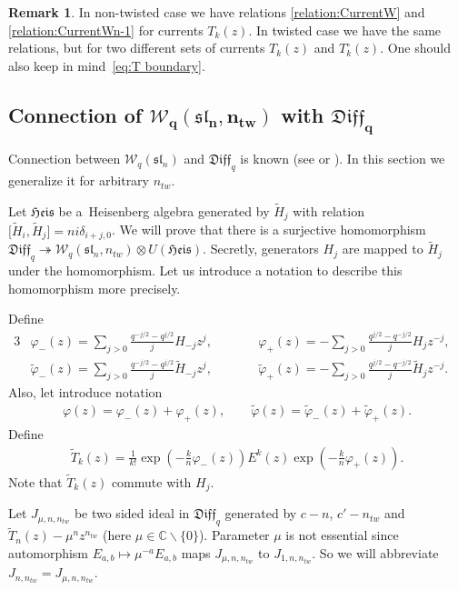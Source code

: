\documentclass[pdftex]{sigma}
\numberwithin{equation}{section}
\theoremstyle{definition}
\newtheorem{Remark}[Theorem]{Remark}
\newcommand{\qD}{\mathfrak{Diff}_q}
\newcommand{\T}{\tilde{T}}
\newcommand{ \W }{ \mathcal{W}_{q} ( \mathfrak{sl}_n ) }
\newcommand{ \twW }{ \mathcal{W}_{q} ( \mathfrak{sl}_n, n_{tw} ) }
\newcommand{\tphi}{\tilde{\varphi}}
\newcommand{\UH}{\otimes U(\mathfrak{Heis})}
\newcommand{\WH}{\twW \UH}
\newcommand{\ha}{\tilde{H}}
\begin{document}
\begin{Remark}In non-twisted case we have relations \eqref{relation:CurrentW} and \eqref{relation:CurrentWn-1} for currents $T_k(z)$. In twisted case we have the same relations, but for two different sets of currents $T_k(z)$ and $T_k^\circ(z)$. One should also keep in mind~\eqref{eq:T boundary}.
\end{Remark}

\subsection[Connection of $\twW$ with $\qD$]{Connection of $\boldsymbol{\twW}$ with $\boldsymbol{\qD}$}

Connection between $\W$ and $\qD$ is known (see \cite[Proposition~2.14]{FHSSY} or \cite[Proposition~2.25]{N16}). In this section we generalize it for arbitrary $n_{tw}$.

Let $\mathfrak{Heis}$ be a~Heisenberg algebra generated by $\ha_j$ with relation $\big[\ha_i, \ha_j\big]=ni\delta_{i+j, 0}$. We will prove that there is a surjective homomorphism $\qD \twoheadrightarrow \WH$. Secretly, generators $H_j$ are mapped to $\ha_j$ under the homomorphism. Let us introduce a notation to describe this homomorphism more precisely.

Define
\begin{alignat}{3}
& \varphi_{-} (z) = \sum_{j>0} \frac{q^{-j/2}-q^{j/2}}{j} H_{-j} z^j,\qquad & &
\varphi_{+} (z) = - \sum_{j>0} \frac{q^{j/2}-q^{-j/2}}{j} H_{j} z^{-j}, &\label{def:varphi} \\
& \tphi_{-} (z)= \sum_{j>0} \frac{q^{-j/2}-q^{j/2}}{j} \ha_{-j} z^j, \qquad &&
\tphi_{+} (z)= - \sum_{j>0} \frac{q^{j/2}-q^{-j/2}}{j} \ha_{j} z^{-j}.&\nonumber
\end{alignat}
Also, let introduce notation
\begin{gather}
\varphi(z) =\varphi_-(z)+\varphi_+(z), \qquad \tphi(z) =\tphi_-(z)+\tphi_+(z). \label{def:varphi without pm}
\end{gather}
Define
\begin{gather*}
\T_k (z) = \frac{1}{k!} \exp \left(-\frac{k}{n} \varphi_- (z) \right) E^k (z) \exp \left( - \frac{k}{n} \varphi_+ (z) \right).
\end{gather*}
Note that $\T_k (z)$ commute with $H_{j}$.

Let $J_{\mu ,n,n_{tw}}$ be two sided ideal in $\qD$ generated by $c-n$, $c'-n_{tw}$ and $\T_n(z) - \mu^n z^{n_{tw}}$ (here $\mu \in \mathbb{C} \backslash \{ 0 \}$). Parameter $\mu$ is not essential since automorphism $E_{a,b} \mapsto \mu^{-a} E_{a,b}$ maps $J_{\mu,n, n_{tw}}$ to $J_{1,n, n_{tw}}$. So we will abbreviate $J_{n, n_{tw}} = J_{\mu, n, n_{tw}}$.
\end{document}
